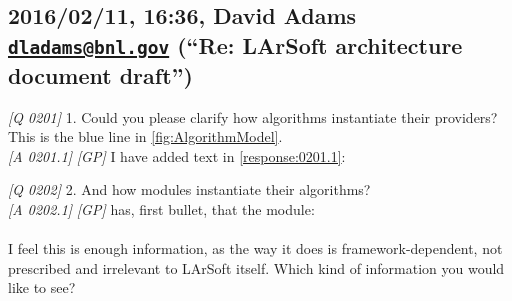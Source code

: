 
\subsection*{\texorpdfstring{2016/02/11, 16:36, David Adams
\href{mailto:dladams@bnl.gov}{\nolinkurl{dladams@bnl.gov}} (``Re: LArSoft architecture document draft'')}{2016/02/11, 16:36, David Adams
\href{mailto:dladams@bnl.gov}{\nolinkurl{dladams@bnl.gov}} (``Re: LArSoft architecture document draft'')}}
\label{sec:comments:DavidAdams-2016-02-11}

\emph{{[}Q 0201{]}}
1. Could you please clarify how algorithms instantiate their providers? This is the blue line in \cref{fig:AlgorithmModel}.\\
\emph{{[}A 0201.1{]}} \emph{{[}GP{]}}
I have added text in \cref{response:0201.1}:\\

\emph{{[}Q 0202{]}}
2. And how modules instantiate their algorithms?\\
\emph{{[}A 0202.1{]}} \emph{{[}GP{]}}
 has, first bullet, that the \ART module:\\
\\
I feel this is enough information, as the way it does is framework-dependent,
not prescribed and irrelevant to LArSoft itself.
Which kind of information you would like to see?


